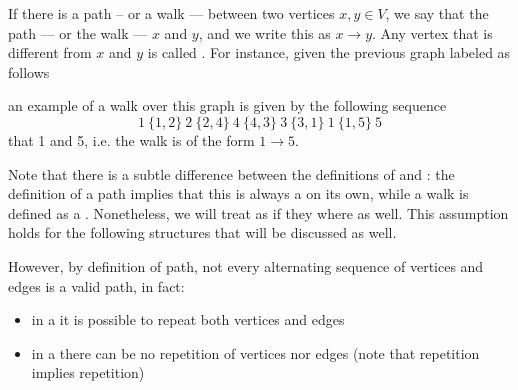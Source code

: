 \documentclass[a4paper, 12pt]{report}
\begin{document}
    If there is a path -- or a walk --- between two vertices $x, y \in V$, we say that the path --- or the walk ---  $x$ and $y$, and we write this as $x \to y$. Any vertex that is different from $x$ and $y$ is called . For instance, given the previous graph labeled as follows

    \begin{figure}[H]
        \centering
    \end{figure}

    an example of a walk over this graph is given by the following sequence $$1 \ \{1, 2\} \ 2 \ \{2, 4\} \ 4 \ \{4, 3\} \ 3 \ \{3, 1\} \ 1 \ \{1, 5\} \ 5$$ that  1 and 5, i.e. the walk is of the form $1 \to 5$.

    Note that there is a subtle difference between the definitions of  and : the definition of a path implies that this is always a  on its own, while a walk is defined as a . Nonetheless, we will treat  as if they where  as well. This assumption holds for the following structures that will be discussed as well.

    However, by definition of path, not every alternating sequence of vertices and edges is a valid path, in fact:
    
    \begin{itemize}
        \item in a  it is possible to repeat both vertices and edges
        \item in a  there can be no repetition of vertices nor edges (note that  repetition implies  repetition)
    \end{itemize}
\end{document}
